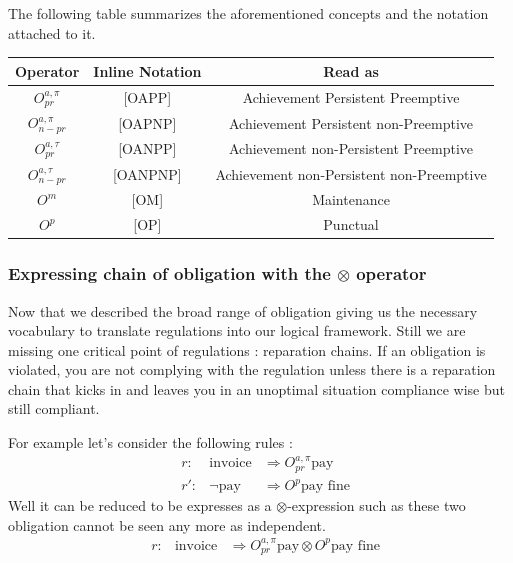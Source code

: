 \documentclass[10pt]{report}
\begin{document}
The following table summarizes the aforementioned concepts and the notation attached to it.

\renewcommand{\arraystretch}{1.5}
\begin{center}
\begin{tabular}{c|c|c}
Operator & Inline Notation & Read as \\
\hline
$O^{a, \pi}_{pr}$     & [OAPP]  & Achievement Persistent Preemptive            \\
$O^{a, \pi}_{n-pr}$   & [OAPNP] & Achievement Persistent non-Preemptive        \\
$O^{a, \tau}_{pr}$    & [OANPP]  & Achievement non-Persistent Preemptive        \\
$O^{a, \tau}_{n-pr}$  & [OANPNP]  & Achievement non-Persistent non-Preemptive    \\
$O^{m}$               & [OM]  & Maintenance                                  \\
$O^{p}$               & [OP]  & Punctual                                     \\
\end{tabular}
\end{center}

\subsubsection{Expressing chain of obligation with the $\otimes$ operator}

Now that we described the broad range of obligation giving us the necessary vocabulary to translate regulations into our logical framework. Still we are missing one critical point of regulations : reparation chains. If an obligation is violated, you are not complying with the regulation unless there is a reparation chain that kicks in and leaves you in an unoptimal situation compliance wise but still compliant.

 For example let's consider the following rules : 
 \[
 \begin{aligned}
   & r : &\text{invoice} & \Rightarrow O^{a, \pi}_{pr}\text{pay}\\
   & r': &\neg \text{pay} & \Rightarrow O^{p}\text{pay fine}
 \end{aligned}
 \]
 Well it can be reduced to be expresses as a $\otimes$-expression such as these two obligation cannot be seen any more as independent. 
  \[
 \begin{aligned}
   & r : &\text{invoice} & \Rightarrow O^{a, \pi}_{pr}\text{pay} \otimes O^{p}\text{pay fine}\\
 \end{aligned}
 \]
\end{document}
